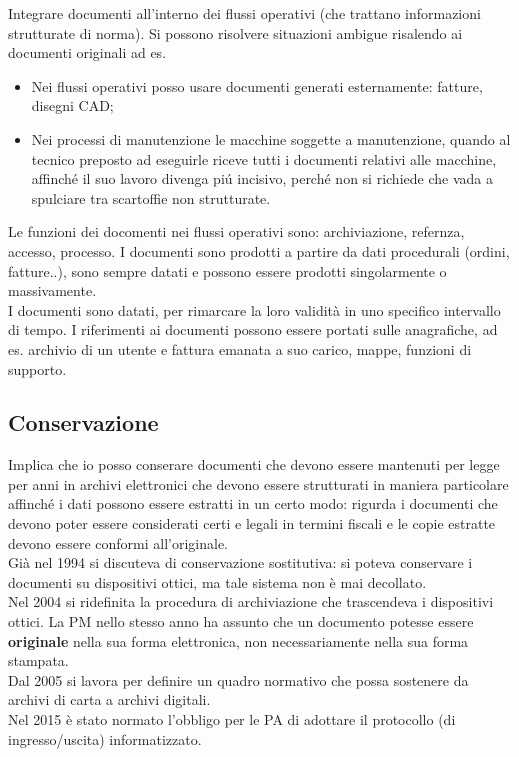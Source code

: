 Integrare documenti all'interno dei flussi operativi (che trattano
informazioni strutturate di norma). Si possono risolvere situazioni
ambigue risalendo ai documenti originali ad es. 

\begin{itemize}
	\item 
	Nei flussi operativi posso usare documenti generati esternamente: fatture, 
	disegni CAD; 
	\item 
	Nei processi di manutenzione le macchine soggette a manutenzione,
	quando al tecnico preposto ad eseguirle riceve tutti i documenti
	relativi alle macchine, affinch\'e il suo lavoro divenga pi\'u incisivo,
	perch\'e non si richiede che vada a spulciare tra scartoffie non
	strutturate.
\end{itemize}

Le funzioni dei docomenti nei flussi operativi sono: archiviazione,
refernza, accesso, processo. I documenti sono prodotti a partire da dati
procedurali (ordini, fatture..), sono sempre datati e possono essere
prodotti singolarmente o massivamente.\\
I documenti sono datati, per rimarcare la loro validit\`a in uno specifico
intervallo di tempo. I riferimenti ai documenti possono essere portati
sulle anagrafiche, ad es. archivio di un utente e fattura emanata a suo
carico, mappe, funzioni di supporto.

\subsection{Conservazione}

Implica che io posso conserare documenti che devono essere mantenuti per
legge per anni in archivi elettronici che devono essere strutturati in
maniera particolare affinch\'e i dati possono essere estratti in un certo
modo: rigurda i documenti che devono poter essere considerati certi e legali in
termini fiscali e le copie estratte devono essere conformi all'originale.\\

Gi\`a nel 1994 si discuteva di conservazione sostitutiva: si poteva
conservare i documenti su dispositivi ottici, ma tale sistema non \`e mai
decollato.\\
Nel 2004 si ridefinita la procedura di archiviazione che trascendeva i
dispositivi ottici. La PM nello stesso anno ha assunto che un documento
potesse essere \textbf{originale} nella sua forma elettronica, non
necessariamente nella sua forma stampata.\\
Dal 2005 si lavora per definire un quadro normativo che possa sostenere
da archivi di carta a archivi digitali.\\
Nel 2015 \`e stato normato l'obbligo per le PA di adottare il protocollo
(di ingresso/uscita) informatizzato.

